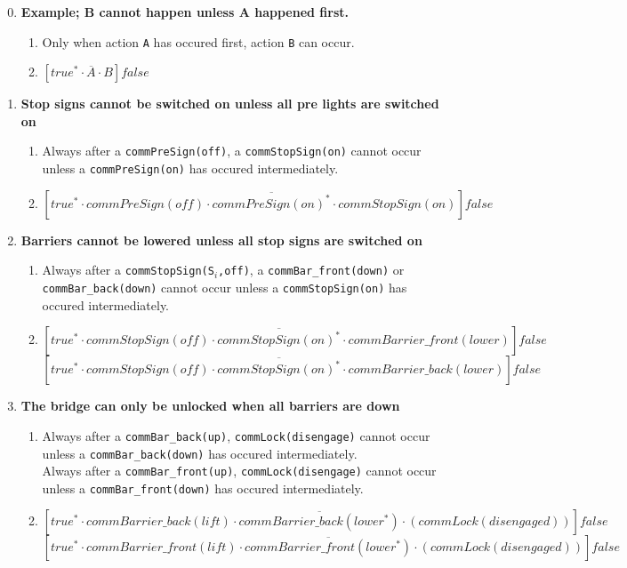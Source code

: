 \begin{enumerate}
  \setcounter{enumi}{-1}


  \item \textbf{Example; B cannot happen unless A happened first.}
  \begin{enumerate}
		\item Only when action \texttt{A} has occured first, action \texttt{B} can occur.
		\item $[true^* \cdot \overline{A} \cdot B]false$
	\end{enumerate}

	\item \textbf{Stop signs cannot be switched on unless all pre lights are switched on}
	\begin{enumerate}
		\item Always after a \texttt{commPreSign(off)}, a \texttt{commStopSign(on)} cannot occur unless a \texttt{commPreSign(on)} has occured intermediately.
		\item $[true^* \cdot commPreSign(off) \cdot \overline{commPreSign(on)^{*}} \cdot commStopSign(on)]false$
	\end{enumerate}

	\item \textbf{Barriers cannot be lowered unless all stop signs are switched on}
	\begin{enumerate}
		\item Always after a \texttt{commStopSign(S$_i$,off)}, a \texttt{commBar\_front(down)} or \texttt{commBar\_back(down)} cannot occur unless a \texttt{commStopSign(on)} has occured intermediately.
		\item $[true^* \cdot commStopSign(off) \cdot \overline{commStopSign(on)^{*}} \cdot commBarrier\_front(lower)]false$ \\
					$[true^* \cdot commStopSign(off) \cdot \overline{commStopSign(on)^{*}} \cdot commBarrier\_back(lower)]false$ \\
	\end{enumerate}

	\item \textbf{The bridge can only be unlocked when all barriers are down}
	\begin{enumerate}
		\item Always after a \texttt{commBar\_back(up)}, \texttt{commLock(disengage)} cannot occur unless a \texttt{commBar\_back(down)} has occured intermediately. \\
					Always after a \texttt{commBar\_front(up)}, \texttt{commLock(disengage)} cannot occur unless a \texttt{commBar\_front(down)} has occured intermediately.
		\item $[true^* \cdot commBarrier\_back(lift) \cdot \overline{commBarrier\_back(lower^{*})} \cdot (commLock(disengaged))]false$
					$[true^* \cdot commBarrier\_front(lift) \cdot \overline{commBarrier\_front(lower^{*})} \cdot (commLock(disengaged))]false$
	\end{enumerate}


\end{enumerate}
